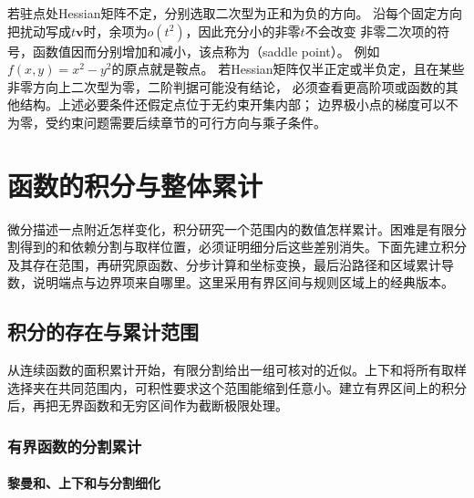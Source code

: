 若驻点处Hessian矩阵不定，分别选取二次型为正和为负的方向。
沿每个固定方向把扰动写成$t\bm v$时，余项为$o(t^2)$，因此充分小的非零$t$不会改变
非零二次项的符号，函数值因而分别增加和减小，该点称为（saddle point）。
例如$f(x,y)=x^2-y^2$的原点就是鞍点。
若Hessian矩阵仅半正定或半负定，且在某些非零方向上二次型为零，二阶判据可能没有结论，
必须查看更高阶项或函数的其他结构。上述必要条件还假定点位于无约束开集内部；
边界极小点的梯度可以不为零，受约束问题需要后续章节的可行方向与乘子条件。

\section{函数的积分与整体累计}
\label{sec:analysis-classical-integration}

微分描述一点附近怎样变化，积分研究一个范围内的数值怎样累计。困难是有限分割得到的和依赖分割与取样位置，必须证明细分后这些差别消失。下面先建立积分及其存在范围，再研究原函数、分步计算和坐标变换，最后沿路径和区域累计导数，说明端点与边界项来自哪里。这里采用有界区间与规则区域上的经典版本。

\subsection{积分的存在与累计范围}

从连续函数的面积累计开始，有限分割给出一组可核对的近似。上下和将所有取样选择夹在共同范围内，可积性要求这个范围能缩到任意小。建立有界区间上的积分后，再把无界函数和无穷区间作为截断极限处理。

\subsubsection{有界函数的分割累计}
\label{sec:analysis-riemann-integral}

\paragraph{黎曼和、上下和与分割细化}

